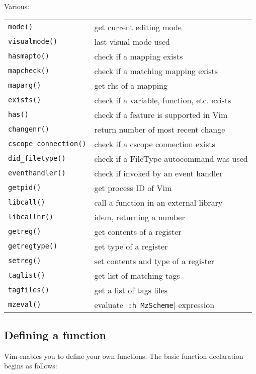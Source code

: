 Various:
\label{various-functions}
\begin{center} \begin{tabular}{l l}
				\texttt{mode()} & get current editing mode \\
				\texttt{visualmode()} & last visual mode used \\
				\texttt{hasmapto()} & check if a mapping exists \\
				\texttt{mapcheck()} & check if a matching mapping exists \\
				\texttt{maparg()} & get rhs of a mapping \\
				\texttt{exists()} & check if a variable, function, etc. exists \\
				\texttt{has()} & check if a feature is supported in Vim \\
				\texttt{changenr()} & return number of most recent change \\
				\texttt{cscope\_connection()} & check if a cscope connection exists \\
				\texttt{did\_filetype()} & check if a FileType autocommand was used \\
				\texttt{eventhandler()} & check if invoked by an event handler \\
				\texttt{getpid()} & get process ID of Vim \\
				\texttt{libcall()} & call a function in an external library \\
				\texttt{libcallnr()} & idem, returning a number \\
				\texttt{getreg()} & get contents of a register \\
				\texttt{getregtype()} & get type of a register \\
				\texttt{setreg()} & set contents and type of a register \\
				\texttt{taglist()} & get list of matching tags \\
				\texttt{tagfiles()} & get a list of tags files \\
				\texttt{mzeval()} & evaluate |\texttt{:h MzScheme}| expression \\
\end{tabular} \end{center}
\subsection{Defining a function}
Vim enables you to define your own functions.
The basic function declaration begins as follows:

